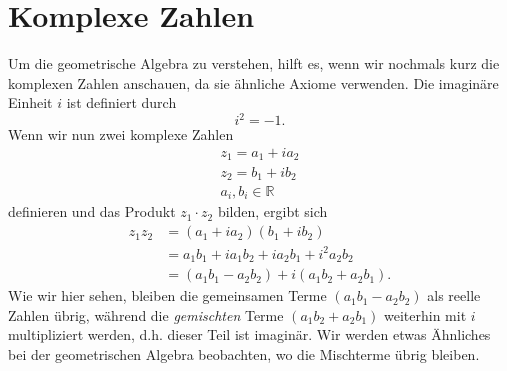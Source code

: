 %
%
%
%
\section{Komplexe Zahlen
\label{geoalgebra:section:komplexe-zahlen}}
Um die geometrische Algebra zu verstehen, hilft es, wenn wir nochmals kurz die komplexen Zahlen anschauen, da sie ähnliche Axiome verwenden.
Die imaginäre Einheit $i$ ist definiert durch
\begin{equation}
  i^2 = -1.
\end{equation}
Wenn wir nun zwei komplexe Zahlen
\begin{align*}
  z_1 = a_1 + i a_2 \\
  z_2 = b_1 + i b_2 \\ 
  a_i, b_i \in \mathbb{R}
\end{align*}
definieren und das Produkt $z_1 \cdot{} z_2$ bilden, ergibt sich
\begin{align*}
  z_1 z_2 &= (a_1 + i a_2) (b_1 + i b_2) \\
  &= a_1 b_1 + i a_1 b_2 + i a_2 b_1 + i^2 a_2 b_2 \\
  &= (a_1 b_1 - a_2 b_2) + i (a_1 b_2 + a_2 b_1).
\end{align*}
Wie wir hier sehen, bleiben die gemeinsamen Terme $(a_1 b_1 - a_2 b_2)$ als reelle Zahlen übrig, während die \emph{gemischten} Terme $(a_1 b_2 + a_2 b_1)$ weiterhin mit $i$
multipliziert werden, d.h. dieser Teil ist imaginär. Wir werden etwas Ähnliches bei der geometrischen Algebra beobachten, wo die Mischterme übrig bleiben.




